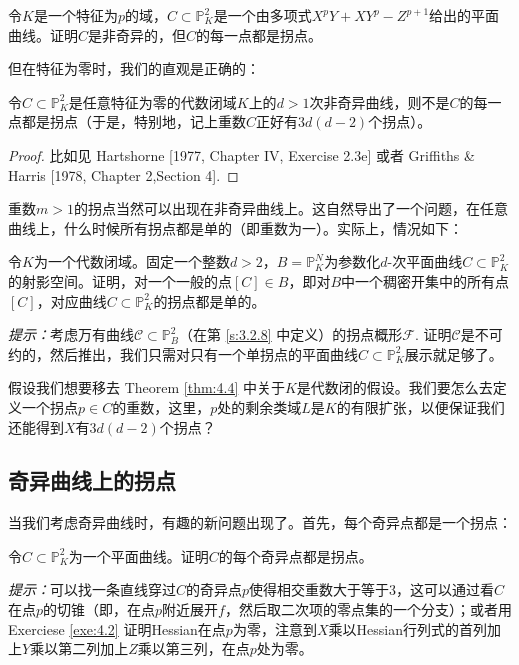 
\begin{exe}\label{exe:4.3}
	令$K$是一个特征为$p$的域，$C\subset \mathbb P_K^2$是一个由多项式$X^p Y+XY^p-Z^{p+1}$给出的平面曲线。证明$C$是非奇异的，但$C$的每一点都是拐点。
\end{exe}

但在特征为零时，我们的直观是正确的：

\begin{thm}\label{thm:4.4}
	令$C\subset \mathbb P_K^2$是任意特征为零的代数闭域$K$上的$d>1$次非奇异曲线，则不是$C$的每一点都是拐点（于是，特别地，记上重数$C$正好有$3d(d-2)$个拐点）。
\end{thm}

\begin{proof}
	比如见 Hartshorne [1977, Chapter IV, Exercise 2.3e] 或者 Griffiths \& Harris [1978, Chapter 2,Section 4].
\end{proof}

重数$m>1$的拐点当然可以出现在非奇异曲线上。这自然导出了一个问题，在任意曲线上，什么时候所有拐点都是单的（即重数为一）。实际上，情况如下：

\begin{exe}\label{exe:4.5}
	令$K$为一个代数闭域。固定一个整数$d>2$，$B=\mathbb P_K^N$为参数化$d$-次平面曲线$C\subset \mathbb P_K^2$的射影空间。证明，对一个一般的点$[C]\in B$，即对$B$中一个稠密开集中的所有点$[C]$，对应曲线$C\subset \mathbb P_K^2$的拐点都是单的。

	\textit{提示：}考虑万有曲线$\mathscr C\subset \mathbb P_B^2$（在第 \ref{s:3.2.8} 中定义）的拐点概形$\mathscr F$. 证明$\mathscr C$是不可约的，然后推出，我们只需对只有一个单拐点的平面曲线$C\subset \mathbb P_K^2$展示就足够了。
\end{exe}

\begin{exe}\label{exe:4.6}
	假设我们想要移去 Theorem \ref{thm:4.4} 中关于$K$是代数闭的假设。我们要怎么去定义一个拐点$p\in C$的重数，这里，$p$处的剩余类域$L$是$K$的有限扩张，以便保证我们还能得到$X$有$3d(d-2)$个拐点？
\end{exe}

\subsection{奇异曲线上的拐点}\label{s:4.1.2}

当我们考虑奇异曲线时，有趣的新问题出现了。首先，每个奇异点都是一个拐点：
\begin{exe}\label{exe:4.7}
	令$C\subset \mathbb P_K^2$为一个平面曲线。证明$C$的每个奇异点都是拐点。

	\textit{提示：}可以找一条直线穿过$C$的奇异点$p$使得相交重数大于等于$3$，这可以通过看$C$在点$p$的切锥（即，在点$p$附近展开$f$，然后取二次项的零点集的一个分支）；或者用 Exerciese \ref{exe:4.2} 证明Hessian在点$p$为零，注意到$X$乘以Hessian行列式的首列加上$Y$乘以第二列加上$Z$乘以第三列，在点$p$处为零。
\end{exe}

